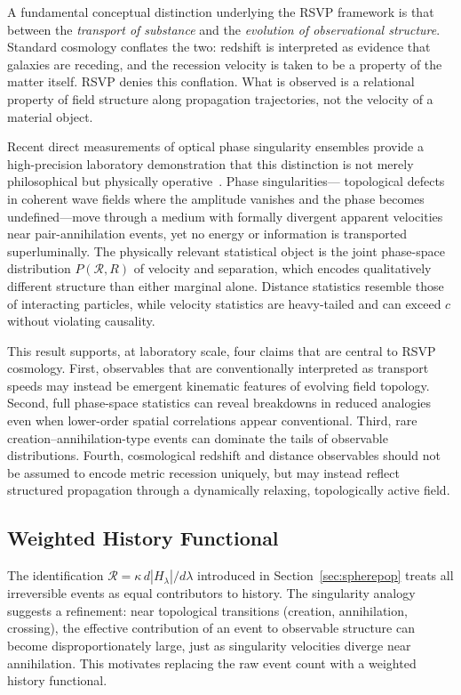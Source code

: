 \documentclass[12pt,a4paper]{article}
\theoremstyle{remark}
\newcommand{\Rcal}{\mathcal{R}}
\begin{document}
A fundamental conceptual distinction underlying the RSVP framework is that
between the \emph{transport of substance} and the \emph{evolution of
observational structure}. Standard cosmology conflates the two: redshift is
interpreted as evidence that galaxies are receding, and the recession velocity
is taken to be a property of the matter itself. RSVP denies this
conflation. What is observed is a relational property of field structure along
propagation trajectories, not the velocity of a material object.

Recent direct measurements of optical phase singularity ensembles provide a
high-precision laboratory demonstration that this distinction is not merely
philosophical but physically operative~\cite{bucher2026}. Phase singularities---
topological defects in coherent wave fields where the amplitude vanishes and
the phase becomes undefined---move through a medium with formally divergent
apparent velocities near pair-annihilation events, yet no energy or information
is transported superluminally. The physically relevant statistical object is
the joint phase-space distribution $P(\mathcal{R}, R)$ of velocity and
separation, which encodes qualitatively different structure than either
marginal alone. Distance statistics resemble those of interacting particles,
while velocity statistics are heavy-tailed and can exceed $c$ without
violating causality.

This result supports, at laboratory scale, four claims that are central to
RSVP cosmology. First, observables that are conventionally interpreted as
transport speeds may instead be emergent kinematic features of evolving field
topology. Second, full phase-space statistics can reveal breakdowns in reduced
analogies even when lower-order spatial correlations appear conventional.
Third, rare creation--annihilation-type events can dominate the tails of
observable distributions. Fourth, cosmological redshift and distance observables
should not be assumed to encode metric recession uniquely, but may instead
reflect structured propagation through a dynamically relaxing, topologically
active field.

\subsection{Weighted History Functional}

The identification $\Rcal = \kappa\,d|H_\lambda|/d\lambda$ introduced in
Section~\ref{sec:spherepop} treats all irreversible events as equal contributors
to history. The singularity analogy suggests a refinement: near topological
transitions (creation, annihilation, crossing), the effective contribution of
an event to observable structure can become disproportionately large, just as
singularity velocities diverge near annihilation. This motivates replacing the
raw event count with a weighted history functional.
\end{document}
